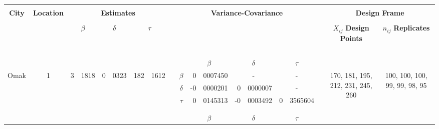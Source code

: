 
		\begin{tabular*}{290mm}{ccr@{.}lr@{.}lr@{.}lccr@{.}lr@{.}lr@{.}lccc}
		\hline	
		\hline		
		\multicolumn{19}{c}{ } \\
		\multirow{3}{*}{\bf{City}} & \multirow{3}{*}{\bf{Location}} &  \multicolumn{6}{c}{\bf{Estimates}} &  & \multicolumn{7}{c}{\bf{Variance-Covariance}} & & \multicolumn{2}{c}{\bf{Design Frame}} \\
		 &  &  \multicolumn{2}{c}{ } & \multicolumn{2}{c}{ } & \multicolumn{2}{c}{ } & &  \multicolumn{7}{c}{ } & &  &  \\
		 &  &  \multicolumn{2}{c}{$\beta$} & \multicolumn{2}{c}{$\delta$} & \multicolumn{2}{c}{$\tau$} & &  \multicolumn{7}{c}{ } & & $X_{ij}$ \bf{Design Points} & $n_{ij}$ \bf{Replicates} \\
		\cline{3-19}
		 &  &  \multicolumn{2}{c}{ \ } & \multicolumn{2}{c}{ } & \multicolumn{2}{c}{ } & &  \multicolumn{7}{c}{ } & &  &  \\
				& 		& 	\multicolumn{2}{c}{  }	& \multicolumn{2}{c}{  }	& \multicolumn{2}{c}{  } &		   &  & \multicolumn{2}{c}{{\bf{$\beta$}}}  &  \multicolumn{2}{c}{{\bf{$\delta$}}}	&   \multicolumn{2}{c}{{\bf{$\tau$}}}	& & 							&  \\
		Omak		& {1}		& 	3&1818 			& 0&0323 			&  182&1612		 & & {\bf{$\beta$}}  &  0&0007450				  &  \multicolumn{2}{c}{ - }			&  \multicolumn{2}{c}{ - }		& & \multirow{3}{*}{170, 181, 195, 212, 231, 245, 260}	& \multirow{3}{*}{100, 100, 100, 99, 99, 98, 95} \\
				& 		& 	\multicolumn{2}{c}{  }	& \multicolumn{2}{c}{  }	& \multicolumn{2}{c}{  } & & {\bf{$\delta$}} & -0&0000201				  &  0&0000007					&  \multicolumn{2}{c}{ - }		& &  							&  \\
				& 		& 	\multicolumn{2}{c}{  }	& \multicolumn{2}{c}{  }	& \multicolumn{2}{c}{  } & & {\bf{$\tau$}}   &  0&0145313				  & -0&0003492					&  0&3565604 				& & 							&  \\		
				\multicolumn{19}{c}{ } \\
				\cline{3-19}
				\multicolumn{19}{c}{ } \\
				& 		& 	\multicolumn{2}{c}{  }	& \multicolumn{2}{c}{  }	& \multicolumn{2}{c}{  } &		   &  & \multicolumn{2}{c}{{\bf{$\beta$}}}  &  \multicolumn{2}{c}{{\bf{$\delta$}}}	&   \multicolumn{2}{c}{{\bf{$\tau$}}}	& & 							&  \\

\end{tabular*}
